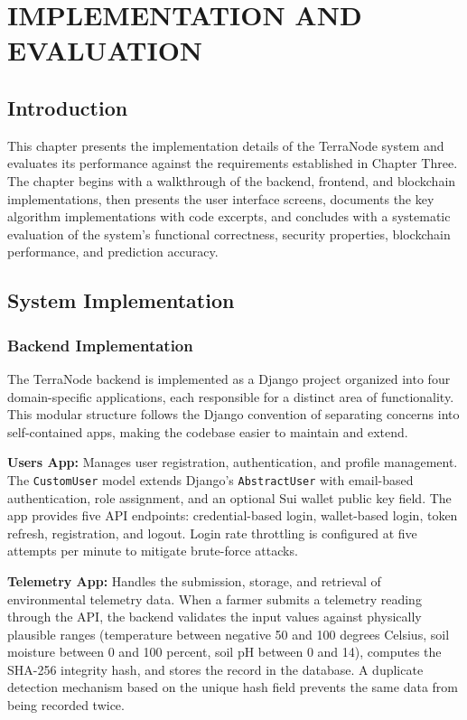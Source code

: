 \chapter{IMPLEMENTATION AND EVALUATION}

\section{Introduction}

This chapter presents the implementation details of the TerraNode system and evaluates its performance against the requirements established in Chapter Three. The chapter begins with a walkthrough of the backend, frontend, and blockchain implementations, then presents the user interface screens, documents the key algorithm implementations with code excerpts, and concludes with a systematic evaluation of the system's functional correctness, security properties, blockchain performance, and prediction accuracy.

\section{System Implementation}

\subsection{Backend Implementation}

The TerraNode backend is implemented as a Django project organized into four domain-specific applications, each responsible for a distinct area of functionality. This modular structure follows the Django convention of separating concerns into self-contained apps, making the codebase easier to maintain and extend.

\textbf{Users App:} Manages user registration, authentication, and profile management. The \texttt{CustomUser} model extends Django's \texttt{AbstractUser} with email-based authentication, role assignment, and an optional Sui wallet public key field. The app provides five API endpoints: credential-based login, wallet-based login, token refresh, registration, and logout. Login rate throttling is configured at five attempts per minute to mitigate brute-force attacks.

\textbf{Telemetry App:} Handles the submission, storage, and retrieval of environmental telemetry data. When a farmer submits a telemetry reading through the API, the backend validates the input values against physically plausible ranges (temperature between negative 50 and 100 degrees Celsius, soil moisture between 0 and 100 percent, soil pH between 0 and 14), computes the SHA-256 integrity hash, and stores the record in the database. A duplicate detection mechanism based on the unique hash field prevents the same data from being recorded twice.

